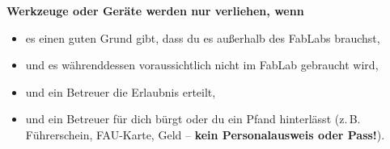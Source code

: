 \documentclass[a4paper,landscape,10pt]{scrartcl}
\begin{document}
\begin{minipage}[t]{0.70\linewidth}
  \textbf{Werkzeuge oder Geräte werden nur verliehen, wenn}
  \begin{itemize}\setlength{\itemsep}{0pt}\setlength{\parskip}{0pt}
    \item es einen guten Grund gibt, dass du es außerhalb des FabLabs brauchst,
    \item und es währenddessen voraussichtlich nicht im FabLab gebraucht wird,
    \item und ein Betreuer die Erlaubnis erteilt,
    \item und ein Betreuer für dich bürgt oder du ein Pfand hinterlässt
          (z.\,B. Führerschein, FAU-Karte, Geld -- \textbf{kein Personalausweis oder Pass!}).
  \end{itemize}
\end{minipage}\hfill
\begin{minipage}[t]{0.27\linewidth}
\end{minipage}
\end{document}
